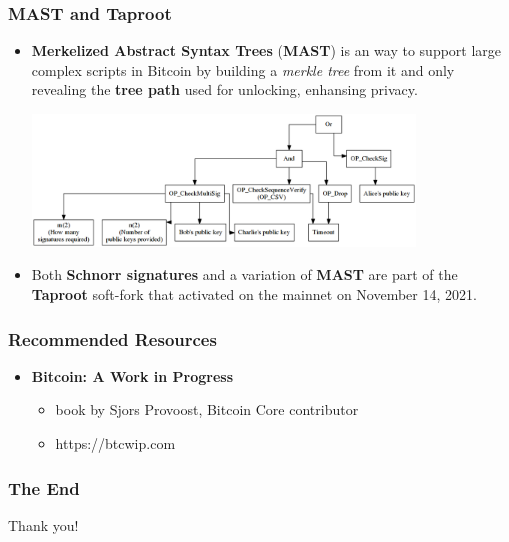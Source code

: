 \documentclass{beamer}
\begin{document}
\begin{frame}
  \frametitle{MAST and Taproot}
  \begin{itemize}
  \item \textbf{Merkelized Abstract Syntax Trees} (\textbf{MAST}) is an way to
    support large complex scripts in Bitcoin by building a \textit{merkle tree}
    from it and only revealing the \textbf{tree path} used for unlocking,
    enhansing privacy.
    \begin{center}
      \includegraphics[width=0.8\textwidth]{mast}
    \end{center}
  \item Both \textbf{Schnorr signatures} and a variation of \textbf{MAST} are
    part of the \textbf{Taproot} soft-fork that activated on the mainnet on
    November 14, 2021.
  \end{itemize}
\end{frame}

\begin{frame}
  \frametitle{Recommended Resources}
  \begin{itemize}
  \item \textbf{Bitcoin: A Work in Progress}
    \begin{itemize}
    \item book by Sjors Provoost, Bitcoin Core contributor
    \item https://btcwip.com
    \end{itemize}
  \end{itemize}
\end{frame}

\begin{frame}
  \frametitle{The End}
  \begin{center}
    Thank you!
  \end{center}
\end{frame}
\end{document}
